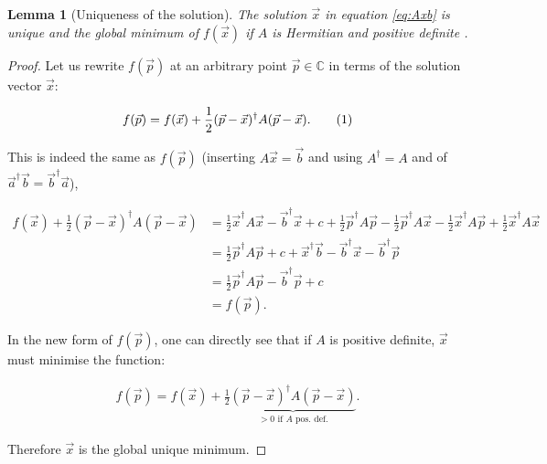 \documentclass{article}
\newcommand\numberthis{\addtocounter{equation}{1}\tag{\theequation}}
\theoremstyle{plain} %
\newtheorem{lemma}[theorem]{Lemma}
\theoremstyle{convention} %
\theoremstyle{remark} %
\numberwithin{equation}{section}
\begin{document}
\begin{lemma}[Uniqueness of the solution]
The solution $\vec{x}$ in equation \eqref{eq:Axb} is unique and the global minimum of $f(\vec{x})$ if $A$ is Hermitian and positive definite \footnotemark.
\end{lemma}


\begin{proof}
Let us rewrite $f(\vec{p})$ at an arbitrary point $\vec{p} \in \mathbb{C}$ in terms of the solution vector $\vec{x}$:

\begin{align*}
    f(\vec{p}) = f(\vec{x}) + \frac{1}{2} (\vec{p} - \vec{x})^{\dagger} A (\vec{p} - \vec{x}). \numberthis \label{eq:fp_cgne}
\end{align*}

This is indeed the same as $f(\vec{p})$ (inserting $A \vec{x} = \vec{b}$ and using $A^{\dagger}=A$ and of $\vec{a}^{\dagger} \vec{b} = \vec{b}^{\dagger} \vec{a}$),

\begin{align*}
f(\vec{x}) + \frac{1}{2} (\vec{p} - \vec{x})^{\dagger} A (\vec{p} - \vec{x}) &= \frac{1}{2} \vec{x}^{\dagger} A \vec{x} - \vec{b}^{\dagger} \vec{x} + c + \frac{1}{2} \vec{p}^{\dagger} A \vec{p} - \frac{1}{2} \vec{p}^{\dagger} A \vec{x} - \frac{1}{2} \vec{x}^{\dagger} A \vec{p} + \frac{1}{2} \vec{x}^{\dagger} A \vec{x} \\
&= \frac{1}{2} \vec{p}^{\dagger} A \vec{p} + c + \vec{x}^{\dagger} \vec{b} - \vec{b}^{\dagger} \vec{x} - \vec{b}^{\dagger} \vec{p} \\
&= \frac{1}{2} \vec{p}^{\dagger} A \vec{p} - \vec{b}^{\dagger} \vec{p} + c \\
&= f(\vec{p}).
\end{align*}

In the new form of $f(\vec{p})$, one can directly see that if $A$ is positive definite, $\vec{x}$ must minimise the function:

\begin{align*}
    f(\vec{p}) = f(\vec{x}) + \frac{1}{2} \underbrace{ (\vec{p} - \vec{x})^{\dagger} A (\vec{p} - \vec{x}) }_{\text{$> 0$ if $A$ pos. def.}}.
\end{align*}

Therefore $\vec{x}$ is the global unique minimum.

\end{proof}
\end{document}

